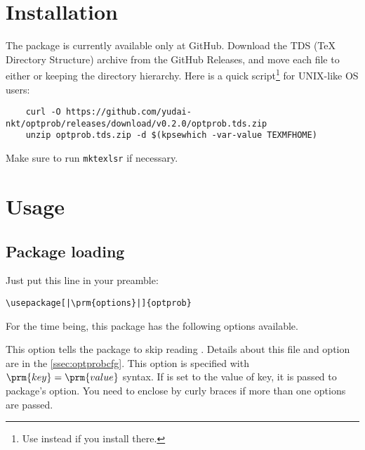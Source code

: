 \documentclass[a4paper,10pt]{article}
\begin{document}
\section{Installation}
The  package is currently available only at GitHub.
Download the TDS (\TeX{} Directory Structure) archive  from the GitHub Releases, and move each file to either  or  keeping the directory hierarchy.
Here is a quick script\footnote{Use  instead if you install there.} for UNIX-like OS users:

\begin{verbatim}
    curl -O https://github.com/yudai-nkt/optprob/releases/download/v0.2.0/optprob.tds.zip
    unzip optprob.tds.zip -d $(kpsewhich -var-value TEXMFHOME)
\end{verbatim}

Make sure to run \mbox{\texttt{mktexlsr}} if necessary.

\section{Usage}
\subsection{Package loading}
Just put this line in your preamble:
\begin{verbatim}
\usepackage[|\prm{options}|]{optprob}
\end{verbatim}
For the time being, this package has the following options available.
\begin{ltxsyntax}
    This option tells the package to skip reading .
    Details about this file and option are in the \cref{ssec:optprobcfg}.
    This option is specified with $\prm{key} = \prm{value}$ syntax.
    If  is set to the value of  key, it is passed to  package's option.
    You need to enclose  by curly braces if more than one options are passed.
\end{ltxsyntax}
\end{document}
